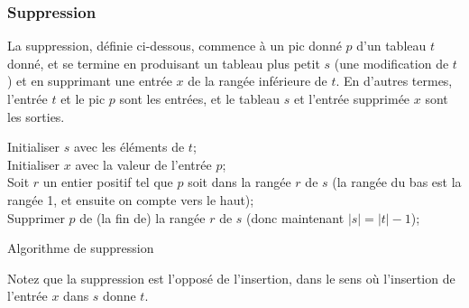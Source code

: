 \subsubsection{Suppression}
La suppression, définie ci-dessous, commence à un pic donné $p$ d'un tableau $t$ donné, 
et se termine en produisant un tableau plus petit $s$ (une modification de $t$) et en supprimant une entrée $x$ de la rangée inférieure de $t$. 
En d'autres termes, l'entrée $t$ et le pic $p$ sont les entrées, et le tableau $s$ et l'entrée supprimée $x$ sont les sorties.\\
\begin{algorithm}
	Initialiser $s$ avec les éléments de $t$; \\
	Initialiser $x$ avec la valeur de l'entrée $p$; \\
	Soit $r$ un entier positif tel que $p$ soit dans la rangée $r$ de $s$ (la rangée du bas est la rangée 1, et ensuite on compte vers le haut); \\
	Supprimer $p$ de (la fin de) la rangée $r$ de $s$ (donc maintenant $|s| = |t| - 1$); \\
	\caption{Algorithme de suppression}
\end{algorithm}
Notez que la suppression est l'opposé de l'insertion, dans le sens où l'insertion de l'entrée $x$ dans $s$ donne $t$.\\
